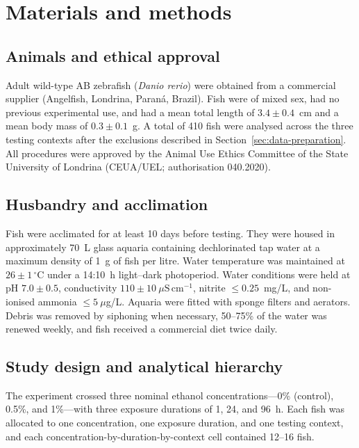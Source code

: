 \documentclass[12pt,a4paper]{article}
\begin{document}
\section{Materials and methods}
\label{sec:methods}

\subsection{Animals and ethical approval}
\label{sec:animals}
Adult wild-type AB zebrafish (\textit{Danio rerio}) were obtained from a commercial supplier (Angelfish, Londrina, Paran\'a, Brazil). Fish were of mixed sex, had no previous experimental use, and had a mean total length of $3.4 \pm 0.4$~cm and a mean body mass of $0.3 \pm 0.1$~g. A total of 410 fish were analysed across the three testing contexts after the exclusions described in Section~\ref{sec:data-preparation}. All procedures were approved by the Animal Use Ethics Committee of the State University of Londrina (CEUA/UEL; authorisation 040.2020).

\subsection{Husbandry and acclimation}
\label{sec:husbandry}
Fish were acclimated for at least 10 days before testing. They were housed in approximately 70~L glass aquaria containing dechlorinated tap water at a maximum density of 1~g of fish per litre. Water temperature was maintained at $26 \pm 1\,^{\circ}\mathrm{C}$ under a 14:10~h light--dark photoperiod. Water conditions were held at pH $7.0 \pm 0.5$, conductivity $110 \pm 10~\mu\mathrm{S\,cm^{-1}}$, nitrite $\leq 0.25$~mg/L, and non-ionised ammonia $\leq 5~\mu$g/L. Aquaria were fitted with sponge filters and aerators. Debris was removed by siphoning when necessary, 50--75\% of the water was renewed weekly, and fish received a commercial diet twice daily.

\subsection{Study design and analytical hierarchy}
\label{sec:study-questions}
The experiment crossed three nominal ethanol concentrations---0\% (control), 0.5\%, and 1\%---with three exposure durations of 1, 24, and 96~h. Each fish was allocated to one concentration, one exposure duration, and one testing context, and each concentration-by-duration-by-context cell contained 12--16 fish.
\end{document}
